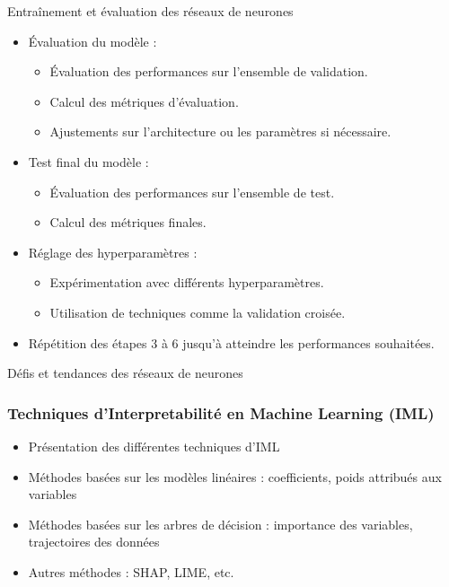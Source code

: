 \documentclass{beamer}
\begin{document}

\begin{frame}{Entraînement et évaluation des réseaux de neurones }
	\begin{itemize}
		
		\item Évaluation du modèle :
		\begin{itemize}
			\item Évaluation des performances sur l'ensemble de validation.
			\item Calcul des métriques d'évaluation.
			\item Ajustements sur l'architecture ou les paramètres si nécessaire.
		\end{itemize}
		
		\item Test final du modèle :
		\begin{itemize}
			\item Évaluation des performances sur l'ensemble de test.
			\item Calcul des métriques finales.
		\end{itemize}
		
		\item Réglage des hyperparamètres :
		\begin{itemize}
			\item Expérimentation avec différents hyperparamètres.
			\item Utilisation de techniques comme la validation croisée.
		\end{itemize}
		
		\item Répétition des étapes 3 à 6 jusqu'à atteindre les performances souhaitées.
	\end{itemize}
\end{frame}

\begin{frame}{Défis et tendances des réseaux de neurones  }
	
\end{frame}



\begin{frame}
	\frametitle{Techniques d'Interpretabilité en Machine Learning (IML)}
	\begin{itemize}
		\item Présentation des différentes techniques d'IML
		\item Méthodes basées sur les modèles linéaires : coefficients, poids attribués aux variables
		\item Méthodes basées sur les arbres de décision : importance des variables, trajectoires des données
		\item Autres méthodes : SHAP, LIME, etc.
	\end{itemize}
\end{frame}
\end{document}

